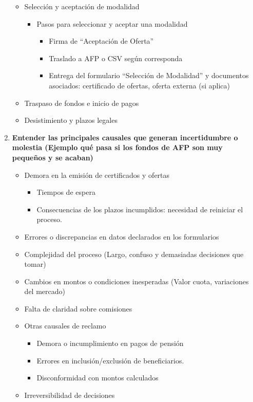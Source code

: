 \begin{enumerate}
\begin{itemize}
\begin{itemize}
    \end{itemize}
    \item Selección y aceptación de modalidad
    \begin{itemize}
        \item Pasos para seleccionar y aceptar una modalidad 
        \begin{itemize}
        \item Firma de “Aceptación de Oferta”
        \item Traslado a AFP o CSV según corresponda
        \item Entrega del formulario “Selección de Modalidad” y documentos asociados: certificado de ofertas, oferta externa (si aplica)
        \end{itemize}
    \end{itemize}
    \item Traspaso de fondos e inicio de pagos
    \item Desistimiento y plazos legales
\end{itemize}

\item \textbf{Entender las principales causales que generan incertidumbre o molestia (Ejemplo qué pasa si los fondos de AFP son muy pequeños y se acaban)	}	
\begin{itemize}
    \item Demora en la emisión de certificados y ofertas
    \begin{itemize}
        \item Tiempos de espera
        \item Consecuencias de los plazos incumplidos: necesidad de reiniciar el proceso.
    \end{itemize}
    \item Errores o discrepancias en datos declarados en los formularios
    \item Complejidad del proceso (Largo, confuso y demasiadas decisiones que tomar) 
    \item Cambios en montos o condiciones inesperadas (Valor cuota, variaciones del mercado) 
    \item Falta de claridad sobre comisiones
    \item Otras causales de reclamo
    \begin{itemize}
        \item Demora o incumplimiento en pagos de pensión
        \item Errores en inclusión/exclusión de beneficiarios.
        \item Disconformidad con montos calculados
    \end{itemize}
    \item Irreversibilidad de decisiones    
\end{itemize}


\end{enumerate}
